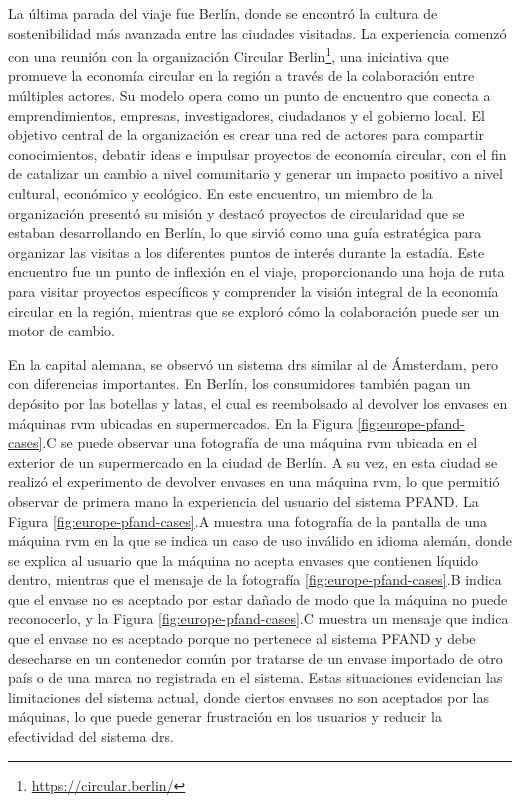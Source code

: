 La última parada del viaje fue Berlín, donde se encontró la cultura de sostenibilidad más avanzada entre las ciudades visitadas. La experiencia comenzó con una reunión con la organización Circular Berlin\footnote{\url{https://circular.berlin/}}, una iniciativa que promueve la economía circular en la región a través de la colaboración entre múltiples actores. Su modelo opera como un punto de encuentro que conecta a emprendimientos, empresas, investigadores, ciudadanos y el gobierno local. El objetivo central de la organización es crear una red de actores para compartir conocimientos, debatir ideas e impulsar proyectos de economía circular, con el fin de catalizar un cambio a nivel comunitario y generar un impacto positivo a nivel cultural, económico y ecológico. En este encuentro, un miembro de la organización presentó su misión y destacó proyectos de circularidad que se estaban desarrollando en Berlín, lo que sirvió como una guía estratégica para organizar las visitas a los diferentes puntos de interés durante la estadía. Este encuentro fue un punto de inflexión en el viaje, proporcionando una hoja de ruta para visitar proyectos específicos y comprender la visión integral de la economía circular en la región, mientras que se exploró cómo la colaboración puede ser un motor de cambio.

En la capital alemana, se observó un sistema \gls{drs} similar al de Ámsterdam, pero con diferencias importantes. En Berlín, los consumidores también pagan un depósito por las botellas y latas, el cual es reembolsado al devolver los envases en máquinas \acrshort{rvm} ubicadas en supermercados. En la Figura \ref{fig:europe-pfand-cases}.C se puede observar una fotografía de una máquina \acrshort{rvm} ubicada en el exterior de un supermercado en la ciudad de Berlín. A su vez, en esta ciudad se realizó el experimento de devolver envases en una máquina \acrshort{rvm}, lo que permitió observar de primera mano la experiencia del usuario del sistema PFAND. La Figura \ref{fig:europe-pfand-cases}.A muestra una fotografía de la pantalla de una máquina \acrshort{rvm} en la que se indica un caso de uso inválido en idioma alemán, donde se explica al usuario que la máquina no acepta envases que contienen líquido dentro, mientras que el mensaje de la fotografía \ref{fig:europe-pfand-cases}.B indica que el envase no es aceptado por estar dañado de modo que la máquina no puede reconocerlo, y la Figura \ref{fig:europe-pfand-cases}.C muestra un mensaje que indica que el envase no es aceptado porque no pertenece al sistema PFAND y debe desecharse en un contenedor común por tratarse de un envase importado de otro país o de una marca no registrada en el sistema. Estas situaciones evidencian las limitaciones del sistema actual, donde ciertos envases no son aceptados por las máquinas, lo que puede generar frustración en los usuarios y reducir la efectividad del sistema \gls{drs}. 

